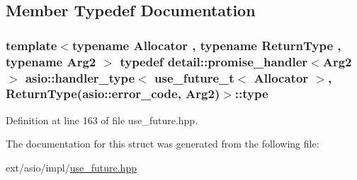 \subsection{Member Typedef Documentation}
\hypertarget{structasio_1_1handler__type_3_01use__future__t_3_01_allocator_01_4_00_01_01_01_01_01_01_01_01_01912bb47ba4497b53d32e350e5bfa0a51_a77bcd6ab17577d0adf5835708fb32989}{}
\subsubsection[{type}]{\setlength{\rightskip}{0pt plus 5cm}template$<$typename Allocator , typename Return\+Type , typename Arg2 $>$ typedef {\bf detail\+::promise\+\_\+handler}$<$Arg2$>$ {\bf asio\+::handler\+\_\+type}$<$ {\bf use\+\_\+future\+\_\+t}$<$ Allocator $>$,           Return\+Type({\bf asio\+::error\+\_\+code}, Arg2)$>$\+::{\bf type}}\label{structasio_1_1handler__type_3_01use__future__t_3_01_allocator_01_4_00_01_01_01_01_01_01_01_01_01912bb47ba4497b53d32e350e5bfa0a51_a77bcd6ab17577d0adf5835708fb32989}


Definition at line 163 of file use\+\_\+future.\+hpp.



The documentation for this struct was generated from the following file\+:\begin{DoxyCompactItemize}
\item 
ext/asio/impl/\hyperlink{impl_2use__future_8hpp}{use\+\_\+future.\+hpp}\end{DoxyCompactItemize}

